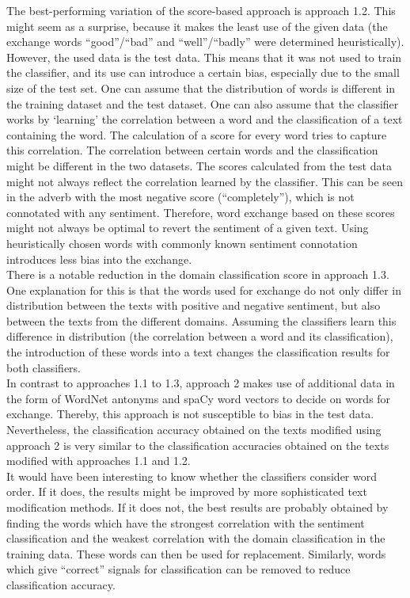 \documentclass[11pt,a4paper]{article}
\begin{document}
The best-performing variation of the score-based approach is approach 1.2. This might seem as a surprise, because it makes the least use of the given data (the exchange words ``good''/``bad'' and ``well''/``badly'' were determined heuristically). However, the used data is the test data. This means that it was not used to train the classifier, and its use can introduce a certain bias, especially due to the small size of the test set. One can assume that the distribution of words is different in the training dataset and the test dataset. One can also assume that the classifier works by ‘learning’ the correlation between a word and the classification of a text containing the word. The calculation of a score for every word tries to capture this correlation. The correlation between certain words and the classification might be different in the two datasets. The scores calculated from the test data might not always reflect the correlation learned by the classifier. This can be seen in the adverb with the most negative score (``completely''), which is not connotated with any sentiment. Therefore, word exchange based on these scores might not always be optimal to revert the sentiment of a given text. Using heuristically chosen words with commonly known sentiment connotation introduces less bias into the exchange.\\
There is a notable reduction in the domain classification score in approach 1.3. One explanation for this is that the words used for exchange do not only differ in distribution between the texts with positive and negative sentiment, but also between the texts from the different domains. Assuming the classifiers learn this difference in distribution (the correlation between a word and its classification), the introduction of these words into a text changes the classification results for both classifiers.\\
In contrast to approaches 1.1 to 1.3, approach 2 makes use of additional data in the form of WordNet antonyms and spaCy word vectors to decide on words for exchange. Thereby, this approach is not susceptible to bias in the test data. Nevertheless, the classification accuracy obtained on the texts modified using approach 2 is very similar to the classification accuracies obtained on the texts modified with approaches 1.1 and 1.2. \\
It would have been interesting to know whether the classifiers consider word order. If it does, the results might be improved by more sophisticated text modification methods. If it does not, the best results are probably obtained by finding the words which have the strongest correlation with the sentiment classification and the weakest correlation with the domain classification in the training data. These words can then be used for replacement. Similarly, words which give ``correct'' signals for classification can be removed to reduce classification accuracy.\\
\end{document}
